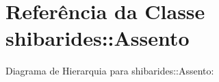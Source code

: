 \hypertarget{classshibarides_1_1Assento}{}\section{Referência da Classe shibarides\+:\+:Assento}
\label{classshibarides_1_1Assento}


Diagrama de Hierarquia para shibarides\+:\+:Assento\+:
